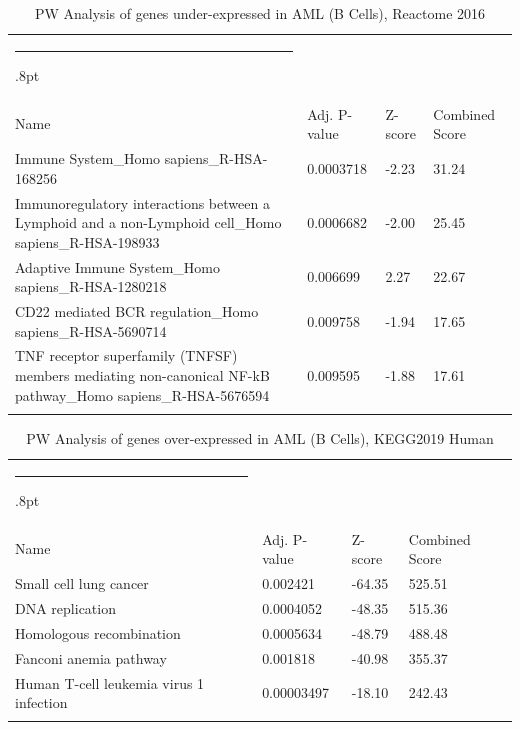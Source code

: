 \documentclass[3p,authoryear,preprint,12pt]{elsarticle}
\makeatletter
\def\hlinewd#1{%
  \noalign{\ifnum0=`}\fi\hrule \@height #1%
  \futurelet\reserved@a\@xhline}
\def\tbltoprule{\hlinewd{.8pt}\\[-12pt]}
\def\tblbottomrule{\noalign{\vspace*{6pt}}\hline\noalign{\vspace*{2pt}}}
\def\tblmidrule{\noalign{\vspace*{6pt}}\hline\noalign{\vspace*{2pt}}}
\makeatother
\begin{document}
\begin{table}[!htbp]
	\caption{{PW Analysis of genes under-expressed in AML (B Cells), Reactome 2016} }
	\label{tw-de478ae31cy6}
	\def\arraystretch{1}
	\ignorespaces 
	\centering 
	\begin{tabulary}{\linewidth}{p{\dimexpr.65\tabcolsep}p{\dimexpr.15\tabcolsep}p{\dimexpr.1\tabcolsep}p{\dimexpr.1\tabcolsep}}
		\tbltoprule Name & Adj. P-value & Z-score & Combined Score\\
		\tblmidrule
Immune System\_Homo sapiens\_R-HSA-168256 & 0.0003718 & -2.23 & 31.24 \\
Immunoregulatory interactions between a Lymphoid and a non-Lymphoid cell\_Homo sapiens\_R-HSA-198933 & 0.0006682 & -2.00 & 25.45 \\
Adaptive Immune System\_Homo sapiens\_R-HSA-1280218 & 0.006699 & 2.27 & 22.67 \\
CD22 mediated BCR regulation\_Homo sapiens\_R-HSA-5690714 & 0.009758 & -1.94 & 17.65 \\
TNF receptor superfamily (TNFSF) members mediating non-canonical NF-kB pathway\_Homo sapiens\_R-HSA-5676594 & 0.009595 & -1.88 & 17.61 \\
		\tblbottomrule
	\end{tabulary}\par 
\end{table}
\begin{table}[!htbp]
	\caption{{PW Analysis of genes over-expressed in AML (B Cells), KEGG2019 Human} }
	\label{tw-de478ae31cz6}
	\def\arraystretch{1}
	\ignorespaces 
	\centering 
	\begin{tabulary}{\linewidth}{p{\dimexpr.65\tabcolsep}p{\dimexpr.15\tabcolsep}p{\dimexpr.1\tabcolsep}p{\dimexpr.1\tabcolsep}}
		\tbltoprule Name & Adj. P-value & Z-score & Combined Score\\
		\tblmidrule
Small cell lung cancer & 0.002421 & -64.35 & 525.51 \\
DNA replication & 0.0004052 & -48.35 & 515.36 \\
Homologous recombination & 0.0005634 & -48.79 & 488.48 \\
Fanconi anemia pathway & 0.001818 & -40.98 & 355.37 \\
Human T-cell leukemia virus 1 infection & 0.00003497 & -18.10 & 242.43 \\
		\tblbottomrule
	\end{tabulary}\par 
\end{table}
\end{document}
